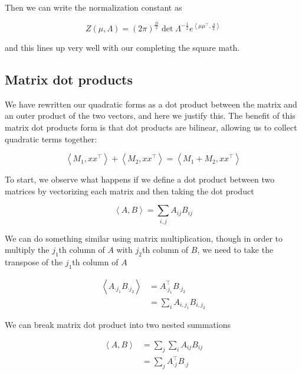 \documentclass[a4paper]{article}
\begin{document}
Then we can write the normalization constant as

\begin{equation}
  Z(\mu,\Lambda) = 
  \left( 2 \pi \right)^{ \frac{D}{2} }
  \det \Lambda^{ - \frac{1}{2} }
  e^{
    \left< \mu \mu^\intercal, \frac{\Lambda}{2} \right>
  }
  \label{}
\end{equation}

and this lines up very well with our completing the square math.

\subsection{Matrix dot products}

  We have rewritten our quadratic forms as a dot product between the matrix and an outer product of the two vectors, and here we justify this. 
The benefit of this matrix dot products form is that dot products are bilinear, allowing us to collect quadratic terms together:

\begin{equation}
  \left< M_1, x x^\intercal \right> + \left< M_2, x x^\intercal \right> = \left< M_1 + M_2, x x^\intercal \right>
\end{equation}

  To start, we observe what happens if we define a dot product between two matrices by vectorizing each matrix and then taking the dot product

\begin{equation}
  \left< A, B \right> = \sum_{i,j} A_{ij} B_{ij}
  \label{}
\end{equation}

  We can do something similar using matrix multiplication, though in order to multiply the $j_1$th column of $A$ with $j_2$th column of $B$, we need to take the transpose of the $j_1$th column of $A$

\begin{equation}
  \begin{split}
    \left< A_{\cdot j_1} B_{ \cdot j_2 } \right> &= 
      A_{ \cdot j_1} ^\intercal
      B_{ \cdot j_2} \\
      &= \sum_i A_{i,j_1} B_{i,j_2}
  \end{split}
  \label{}
\end{equation}

  We can break matrix dot product into two nested summations

\begin{equation}
  \begin{split}
    \left< A, B \right> &= 
      \sum_j \sum_i A_{ij} B_{ij} \\
      &= \sum_j
        A_{ \cdot j} ^ \intercal
	B_{ \cdot j}
  \end{split}
  \label{}
\end{equation}
\end{document}
